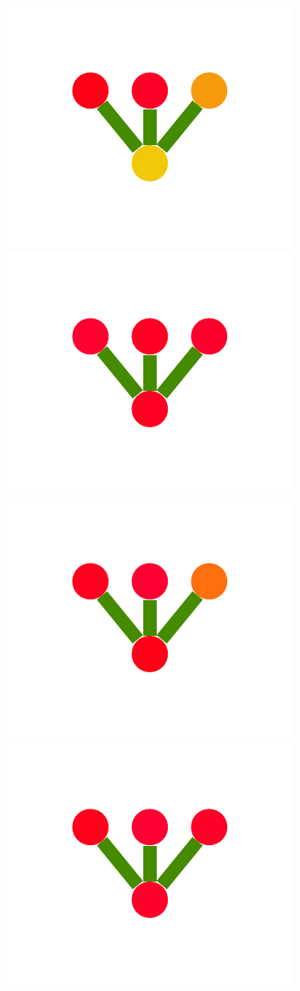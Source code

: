 \documentclass[a4paper,10pt]{article}
\begin{document}
\begin{figure}
{    \includegraphics[scale=.26]{./figures/4-2-2-mergeprog-bad-3.pdf}
    \includegraphics[scale=.26]{./figures/4-2-2-mergeprog-bad-4.pdf}
    \includegraphics[scale=.26]{./figures/4-2-2-mergeprog-bad-5.pdf}
    \includegraphics[scale=.26]{./figures/4-2-2-mergeprog-bad-6.pdf}
}
\end{figure}
\end{document}
